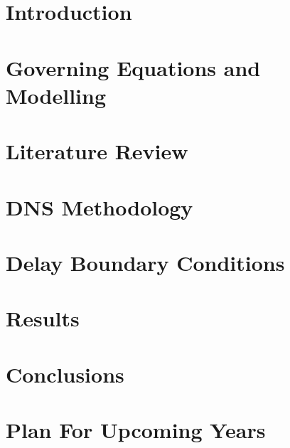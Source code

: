 \documentclass[lmr,second,hyperref,rgb,hyperref,dvipsnames]{uom_thesis_casson}
\title{\xmp@Title}
\author{\xmp@Author}
\begin{document}
\maketitle



\uomtoc

\uomstartmainbody %

\chapter{Introduction} \label{ch:intro}


\chapter{Governing Equations and Modelling} \label{ch:govern-eqns}


\chapter{Literature Review} \label{ch:lit-review}


\chapter{DNS Methodology} \label{ch:dns-methods}


% 

\chapter{Delay Boundary Conditions} \label{ch:delay-bcs}


\chapter{Results} \label{ch:results}


\chapter{Conclusions} \label{ch:conc}


\chapter{Plan For Upcoming Years} \label{ch:plan}



\printbibliography[title={References},heading=bibintoc]
\end{document}
